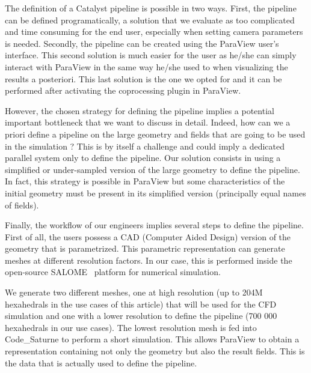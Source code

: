 The definition of a Catalyst pipeline is possible in two ways. First, the
pipeline can be defined programatically, a solution that we evaluate as too
complicated and time consuming for the end user, especially when setting camera
parameters is needed. Secondly,  the pipeline can be created using the ParaView
user's interface. This second solution is much easier for the user as he/she
can  simply interact with ParaView in the same way he/she used to when
visualizing the results a posteriori. This last solution is the one we 
opted for and it can
be performed after activating the coprocessing plugin in ParaView. 

However, the chosen strategy for defining the pipeline implies a potential
important bottleneck that we want to discuss in detail. Indeed, how can we a
priori define a pipeline on the large geometry and fields that are going to
be used in the simulation ? This is by itself a challenge and could imply a
dedicated parallel system only to define the pipeline. Our solution consists in
using a simplified or under-sampled version of the large geometry to define the
pipeline. In fact, this strategy is possible in ParaView but some
characteristics of the initial geometry must be present in its simplified version (principally equal
names of fields).

Finally, the workflow of our engineers implies several steps to define the
pipeline.  First of all, the users possess a CAD (Computer Aided Design)
version of the geometry that is parametrized. This parametric representation
can generate meshes at different resolution factors. In our case, this is
performed inside the open-source SALOME~\cite{4291178} platform for numerical simulation. 

We generate two different meshes, one at high resolution (up to 204M
hexahedrals in the use cases of this article) that will be used for the CFD
simulation and one with a lower resolution to define the pipeline (700 000
hexahedrals in our use cases). The lowest resolution mesh is fed into Code\_Saturne to perform a short
simulation. This allows ParaView to obtain a representation containing not
only the geometry but also the result fields. This is the data that is 
actually used to define the pipeline.

